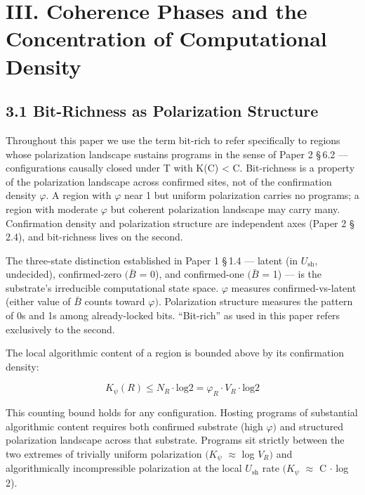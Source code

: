 \documentclass[11pt,oneside]{report}
\theoremstyle{definition}
\theoremstyle{remark}
\begin{document}
\section*{III. Coherence Phases and the Concentration of Computational Density}

\subsection*{3.1 Bit-Richness as Polarization Structure}

Throughout this paper we use the term bit-rich to refer specifically to
regions whose polarization landscape sustains programs in the sense of
Paper 2 \S\,6.2 --- configurations causally closed under T with K(C)
\textless{} \textbar C\textbar. Bit-richness is a property of the
polarization landscape across confirmed sites, not of the confirmation
density \ensuremath{\varphi .} A region with \ensuremath{\varphi} near 1 but uniform polarization carries no
programs; a region with moderate \ensuremath{\varphi} but coherent polarization landscape
may carry many. Confirmation density and polarization structure are
independent axes (Paper 2 \S\,2.4), and bit-richness lives on the second.

The three-state distinction established in Paper 1 \S\,1.4 --- latent (in
\ensuremath{U_{\mathrm{sh}},} undecided), confirmed-zero \ensuremath{(\bar{B}} = 0), and confirmed-one \ensuremath{(\bar{B}} = 1) ---
is the substrate's irreducible computational state space. \ensuremath{\varphi} measures
confirmed-vs-latent (either value of \ensuremath{\bar{B}} counts toward \ensuremath{\varphi ).} Polarization
structure measures the pattern of 0s and 1s among already-locked bits.
``Bit-rich'' as used in this paper refers exclusively to the second.

The local algorithmic content of a region is bounded above by its
confirmation density:

\begin{equation*}
K_{\psi}(R) \leq N_{R} \cdot \text{log} 2 = \varphi_{R} \cdot V_{R} \cdot \text{log} 2
\end{equation*}

This counting bound holds for any configuration. Hosting programs of
substantial algorithmic content requires both confirmed substrate (high
\ensuremath{\varphi )} and structured polarization landscape across that substrate. Programs
sit strictly between the two extremes of trivially uniform polarization
\ensuremath{(K_{\psi}} \ensuremath{\approx} log \ensuremath{V_{R})} and algorithmically incompressible polarization at the
local \ensuremath{U_{\mathrm{sh}}} rate \ensuremath{(K_{\psi}} \ensuremath{\approx} \textbar C\textbar{} \ensuremath{\cdot} log 2).
\end{document}
